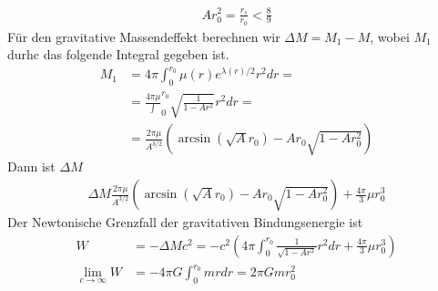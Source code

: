 \documentclass[a4paper]{article}
\begin{document}
\begin{align}
    Ar_0^2 = \frac{r_s}{r_0} < \frac{8}{9}
\end{align}
Für den gravitative Massendeffekt berechnen wir $\Delta M= M_1 -M$, wobei
$M_1$ durhc das folgende Integral gegeben ist.
\begin{align}
    M_1 &= 4\pi \int _0^{r_0}\mu(r) e^{\lambda(r)/2}r^2 dr =\\
    &= \frac{4\pi\mu} \int_0^{r_0} \sqrt{\frac{1}{1-Ar^2}} r^2 dr= \\
    &= \frac{2\pi\mu}{A^{3/2}} (\arcsin(\sqrt{A}r_0) -Ar_0\sqrt{1-Ar_0^2})
\end{align}
Dann ist $\Delta M$
\begin{align}
    \Delta M \frac{2\pi\mu}{A^{3/2}} (\arcsin(\sqrt{A}r_0)
    -Ar_0\sqrt{1-Ar_0^2})  + \frac{4\pi}{3} \mu r_0^3
\end{align}
Der Newtonische Grenzfall der gravitativen Bindungsenergie ist
\begin{align}
    W &= -\Delta M c^2 = -c^2(4\pi\int _0^{r_0} \frac{1}{\sqrt{1-Ar^2}} r^2
    dr + \frac{4\pi}{3} \mu r^3_0) \\
    \lim_{c\rightarrow \infty} W &= -4\pi G \int_0^{r_0} m rdr
    = 2\pi Gmr_0^2
\end{align}
\end{document}
